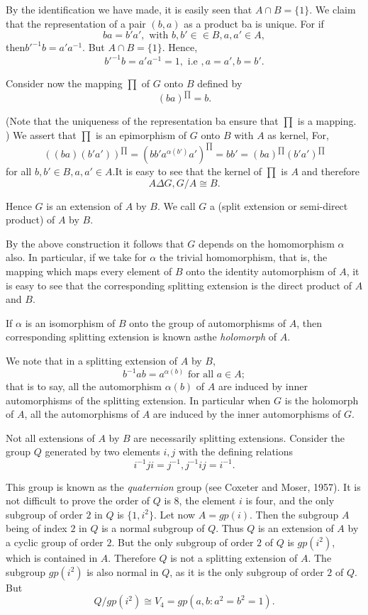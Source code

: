 By the identification we have made, it is easily seen that $A \cap B=
\{ 1 \}$. We claim that the representation of a pair $(b, a)$ as a
product ba is unique. For if  
$$
ba= b' a', \text{ with } b,b' \in  \in  B, a,a' \in  A,
$$
then\pageoriginale ${b'^{-1}}b=a' a^{-1}$. But $A \cap B = \{ 1\}$. Hence,
$$
{b'}^{-1}b =a' a^{-1}=1, \text{ i.e }, a= a', b=b'. 
$$

Consider now the mapping $\prod$ of $G$ onto $B$ defined by
$$
(ba)^{\prod}=b.
$$

(Note that the uniqueness of the representation ba ensure that
$\prod$ is a mapping. ) We assert that $\prod$ is an epimorphism of
$G$ onto $B$ with $A$ as kernel, For, 
$$
((ba)(b'a'))^{\prod} = (bb'a^{\alpha (b')}a')^{\prod} = bb'
=(ba)^{\prod} (b'a')^{\prod} 
$$
for all $b, b' \in  B, a, a' \in  A$.It is easy to see
that the kernel of $\prod$ is $A$ and therefore  
$$
A \Delta G,  G/A \cong B.
$$

Hence $G$ is an extension of $A$ by $B$. We call  $G$ a
 (split extension or semi-direct product) of
$A$ by $B$. 

By the above construction it follows that $G$ depends on the
homomorphism $\alpha$ also. In particular, if we take for $\alpha$ the
trivial homomorphism, that is, the mapping which maps every element of
$B$ onto the identity automorphism of $A$, it is easy to see that the
corresponding splitting extension is the direct product of $A$ and
$B$. 

If $\alpha$ is an isomorphism of $B$ onto the group of automorphisms
of $A$, then corresponding splitting extension is known as\pageoriginale the
\textit{holomorph} of $A$. 

We note that in a splitting extension of $A$ by $B$, 
$$
b^{-1} ab=a^{\alpha (b)} \text{ for all } a \in  A ;
$$
that is to say, all the automorphism $\alpha (b)$ of $A$ are induced
by inner automorphisms of the splitting extension.  In particular when
$G$ is the holomorph of $A$, all the automorphisms of $A$ are induced
by the inner automorphisms of $G$. 

Not all extensions of $A$ by $B$ are necessarily splitting
extensions. Consider the group $Q$ generated by two elements $i, j$
with the defining relations  
$$
i^{-1}ji = j^{-1}, j^{-1}ij =i^{-1}.
$$

This group is known as the \textit{quaternion} group (see Coxeter and
Mo\-ser, 1957). It is not difficult to prove the order of $Q$ is $8$,
the element $i$ is four, and the only subgroup of order $2$ in $Q$ is
$\{ 1, i^2 \}$. Let now $A= gp(i)$. Then the subgroup $A$ being of
index $2$ in $Q$ is a normal subgroup of $Q$. Thus $Q$ is an extension
of $A$ by a cyclic group of order $2$. But the only subgroup of order
$2$ of $Q$ is $gp(i^2)$, which  is contained in $A$. Therefore $Q$ is
not a splitting extension of $A$. The subgroup $gp(i^2)$ is also
normal in $Q$, as it is the only subgroup of order $2$ of $Q$. But  
$$
Q/gp(i^2) \cong V_4 = gp(a,b: a^2= b^2 =1).
$$


